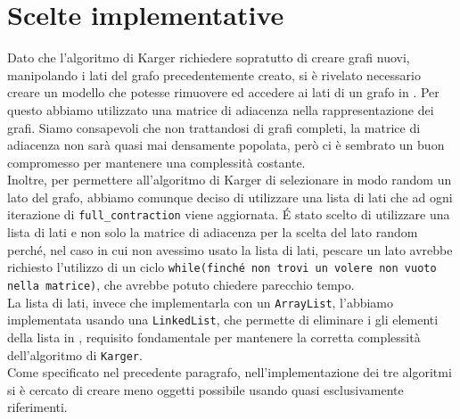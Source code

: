 \section{Scelte implementative}
Dato che l'algoritmo di Karger richiedere sopratutto di creare grafi nuovi, manipolando i lati del grafo precedentemente creato, si è rivelato necessario creare un modello che potesse rimuovere ed accedere ai lati di un grafo in . Per questo abbiamo utilizzato una matrice di adiacenza nella rappresentazione dei grafi. Siamo consapevoli che non trattandosi di grafi completi, la matrice di adiacenza non sarà quasi mai densamente popolata, però ci è sembrato un buon compromesso per mantenere una complessità costante.\\
Inoltre, per permettere all'algoritmo di Karger di selezionare in modo random un lato del grafo, abbiamo comunque deciso di utilizzare una lista di lati che ad ogni iterazione di \texttt{full\_contraction} viene aggiornata. \'E stato scelto di utilizzare una lista di lati e non solo la matrice di adiacenza per la scelta del lato random perché, nel caso in cui non avessimo usato la lista di lati, pescare un lato avrebbe richiesto l'utilizzo di un ciclo \texttt{while(finché non trovi un volere non vuoto nella matrice)}, che avrebbe potuto chiedere parecchio tempo.\\
La lista di lati, invece che implementarla con un \texttt{ArrayList}, l'abbiamo implementata usando una \texttt{LinkedList}, che permette di eliminare i gli elementi della lista in , requisito fondamentale per mantenere la corretta complessità dell'algoritmo di \texttt{Karger}.\\ 
Come specificato nel precedente paragrafo, nell'implementazione dei tre algoritmi si è cercato di creare meno oggetti possibile usando quasi esclusivamente riferimenti. 

